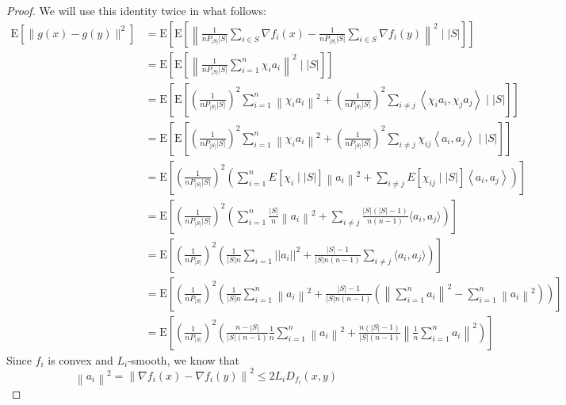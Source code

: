 \documentclass[12pt,a4paper]{article}
\begin{document}
\begin{proof}
	We will use this identity twice in what follows:
	\begin{equation}
	\begin{array}{ll}
		\mathrm{E}\left[\|g(x)-g(y)\|^{2}\right] & \stackrel{}{=} \mathrm{E}\left[\mathrm{E}\left[\left\|\frac{1}{nP_{|S|}|S|} \sum_{i \in S} \nabla f_{i}(x)-\frac{1}{nP_{|S|}|S|} \sum_{i \in S} \nabla f_{i}(y)\right\|^{2}\mid |S|\right]\right] \\
		& \stackrel{}{=}  \mathrm{E}\left[\mathrm{E}\left[\left\|\frac{1}{nP_{|S|}|S|}\sum_{i =1}^{n} \chi_{i}a_{i}\right\|^{2}\mid |S|\right]\right] \\
		& \stackrel{}{=} \mathrm{E}\left[ \mathrm{E}\left[(\frac{1}{nP_{|S|}|S|})^2\sum_{i=1}^{n}\left\|\chi_{i} a_{i}\right\|^{2}+(\frac{1}{nP_{|S|}|S|})^2\sum_{i \neq j}\left\langle\chi_{i} a_{i}, \chi_{j} a_{j}\right\rangle\mid |S|\right] \right]\\
		& \stackrel{}{=} \mathrm{E}\left[\mathrm{E}\left[(\frac{1}{nP_{|S|}|S|})^2\sum_{i=1}^{n}\left\|\chi_{i} a_{i}\right\|^{2}+(\frac{1}{nP_{|S|}|S|})^2\sum_{i \neq j} \chi_{i j}\left\langle a_{i}, a_{j}\right\rangle\mid |S|\right] \right]\\
		& = \mathrm{E}\left[(\frac{1}{nP_{|S|}|S|})^2\left( \sum_{i=1}^{n} E\left[\chi_{i}\mid |S|\right]\left\|a_{i}\right\|^{2}+\sum_{i \neq j} E\left[\chi_{i j}\mid |S|\right]\left\langle a_{i}, a_{j}\right\rangle\right)\right]\\
		&= \mathrm{E}\left[(\frac{1}{nP_{|S|}|S|})^2\left(\sum_{i =1}^n\frac{|S|}{n}\left\|a_i\right\|^2+\sum_{i \neq j}\frac{|S|(|S|-1)}{n(n-1)}\langle a_i,a_j\rangle \right)\right]\\
		&=\mathrm{E}\left[(\frac{1}{nP_{|S|}})^2\left(\frac{1}{|S|n}\sum_{i =1}||a_i||^2+\frac{|S|-1}{|S|n(n-1)}\sum_{i \neq j}\langle a_i,a_j\rangle \right)\right]\\
		&=\mathrm{E}\left[(\frac{1}{nP_{|S|}})^2\left(\frac{1}{|S| n} \sum_{i=1}^{n}\left\|a_{i}\right\|^{2}+\frac{|S|-1}{|S| n(n-1)}\left(\left\|\sum_{i=1}^{n} a_{i}\right\|^{2}-\sum_{i=1}^{n}\left\|a_{i}\right\|^{2}\right)\right)\right]\\
		&=\mathrm{E}\left[(\frac{1}{nP_{|S|}})^2\left(\frac{n-|S|}{|S|(n-1)} \frac{1}{n} \sum_{i=1}^{n}\left\|a_{i}\right\|^{2}+\frac{n(|S|-1)}{|S|(n-1)}\left\|\frac{1}{n} \sum_{i=1}^{n} a_{i}\right\|^{2}\right)\right]
	\end{array}
	\end{equation}
	Since $f_{i}$ is convex and $L_{i}$-smooth, we know that
	$$
	\left\|a_{i}\right\|^{2} \stackrel{}{=}\left\|\nabla f_{i}(x)-\nabla f_{i}(y)\right\|^{2} \leq 2 L_{i} D_{f_{i}}(x, y)
$$
\end{proof}
\end{document}
